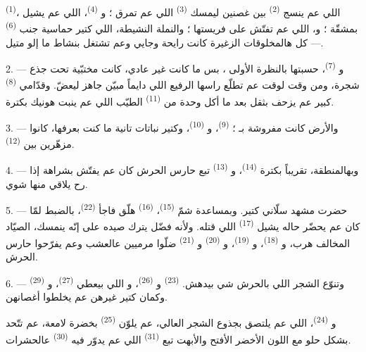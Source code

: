  \textsuperscript{(1)}، اللي عم ينسج 
\textsuperscript{(2)} بين غصنين ليمسك  \textsuperscript{(3)}
اللي عم تمرق ؛ و \textsuperscript{(4)}، اللي عم يشيل
 بمشقّة ؛ و، اللي عم تفتّش على
فريستها ؛ والنملة النشيطة، اللي كتير حماسية جنب 
\textsuperscript{(6)} — كل هالمخلوقات الزغيرة كانت رايحة وجايي وعم
تشتغل بنشاط ما إلو متيل.

2. --- و \textsuperscript{(7)}، حسبتها بالنظرة الأولى
، بس ما كانت غير  عادي، كانت مختبّية تحت جذع
شجرة، ومن وقت لوقت عم تطلّع راسها الرفيع اللي دايماً مبيّن جاهز
ليعضّ. وقدّامي  \textsuperscript{(8)} كبير عم يزحف بثقل بعد
ما أكل وحدة من  \textsuperscript{(11)} الطيّب اللي
عم ينبت هونيك بكترة.

3. --- والأرض كانت مفروشة بـ ؛ 
\textsuperscript{(9)}، و \textsuperscript{(10)}، وكتير نباتات
تانية ما كنت بعرفها، كانوا مزهّرين بين 
\textsuperscript{(12)}.

4. --- وبهالمنطقة،  تقريباً بكترة 
\textsuperscript{(14)}، و \textsuperscript{(13)} تبع حارس
الحرش كان عم يفتّش بشراهة إذا رح يلاقي منها شوي.

\VUsaut{3.0mm}
\VUsaut{3.0mm}

5. --- حضرت  مشهد سلّاني كتير. وبمساعدة شمّ  \textsuperscript{(15)}،  \textsuperscript{(16)}
هلّق فاجأ  \textsuperscript{(22)}، بالضبط لمّا كان عم
يحضّر حاله يشيل  \textsuperscript{(17)} اللي قتله. ولأنه
فضّل يترك صيده على إنّه ينمسك، الصيّاد المخالف هرب، و \textsuperscript{(18)}، و \textsuperscript{(19)}،
و \textsuperscript{(20)} و
\textsuperscript{(21)} ضلّوا مرميين عالعشب وعم يفرّحوا حارس الحرش.

6. --- وتنوّع الشجر اللي بالحرش شي بيدهش. 
\textsuperscript{(23)} و \textsuperscript{(26)}،
و اللي بيعطي  \textsuperscript{(27)}،
و \textsuperscript{(29)} وكمان كتير غيرهن عم يخلطوا
أغصانهن.

و \textsuperscript{(24)}، اللي عم يلتصق بجذوع الشجر
العالي، عم يلوّن  \textsuperscript{(25)} بخضرة لامعة، عم
تتّحد بشكل حلو مع اللون الأخضر الأفتح والأبهت تبع 
\textsuperscript{(31)} اللي عم يدوّر فيه 
\textsuperscript{(30)} عالحشرات.

